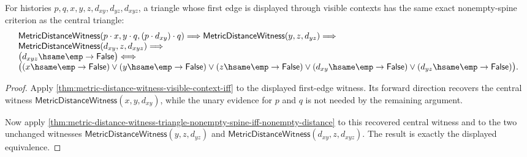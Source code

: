 \begin{theorem}
\label{thm:metric-distance-witness-visible-context-triangle-nonempty-spine-iff-nonempty-distance}
For histories $p,q,x,y,z,d_{xy},d_{yz},d_{xyz}$, a triangle whose first edge is
displayed through visible contexts has the same exact nonempty-spine criterion
as the central triangle:
$$
\begin{array}{l}
\mathsf{MetricDistanceWitness}(p\cdot x,y\cdot q,(p\cdot d_{xy})\cdot q)
\Longrightarrow
\mathsf{MetricDistanceWitness}(y,z,d_{yz})
\Longrightarrow
\\
\mathsf{MetricDistanceWitness}(d_{xy},z,d_{xyz})
\Longrightarrow
\\
\bigl(d_{xyz}\hsame\emp\to\mathsf{False}\bigr)
\Longleftrightarrow
\\
\bigl((x\hsame\emp\to\mathsf{False})\vee
(y\hsame\emp\to\mathsf{False})\vee
(z\hsame\emp\to\mathsf{False})\vee
(d_{xy}\hsame\emp\to\mathsf{False})\vee
(d_{yz}\hsame\emp\to\mathsf{False})\bigr).
\end{array}
$$
\end{theorem}
\begin{proof}
Apply \autoref{thm:metric-distance-witness-visible-context-iff} to the
displayed first-edge witness. Its forward direction recovers the central
witness $\mathsf{MetricDistanceWitness}(x,y,d_{xy})$, while the unary evidence
for $p$ and $q$ is not needed by the remaining argument.

Now apply
\autoref{thm:metric-distance-witness-triangle-nonempty-spine-iff-nonempty-distance}
to this recovered central witness and to the two unchanged witnesses
$\mathsf{MetricDistanceWitness}(y,z,d_{yz})$ and
$\mathsf{MetricDistanceWitness}(d_{xy},z,d_{xyz})$. The result is exactly the
displayed equivalence.
\end{proof}

